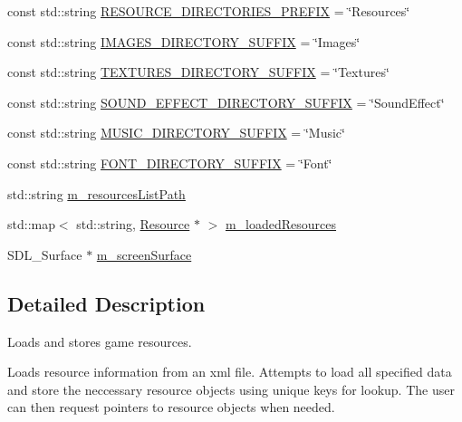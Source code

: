 \begin{DoxyCompactItemize}
\item 
const std\-::string \hyperlink{classn8_1_1_resource_manager_ac7a0bd07466d2db724c71608a373c83e}{R\-E\-S\-O\-U\-R\-C\-E\-\_\-\-D\-I\-R\-E\-C\-T\-O\-R\-I\-E\-S\-\_\-\-P\-R\-E\-F\-I\-X} = \char`\"{}Resources\char`\"{}
\item 
const std\-::string \hyperlink{classn8_1_1_resource_manager_aa8fd98d5b987be54652a08f49e5ac7f7}{I\-M\-A\-G\-E\-S\-\_\-\-D\-I\-R\-E\-C\-T\-O\-R\-Y\-\_\-\-S\-U\-F\-F\-I\-X} = \char`\"{}Images\char`\"{}
\item 
const std\-::string \hyperlink{classn8_1_1_resource_manager_af0ddf0154273d7fa5fc31f63b5ce387c}{T\-E\-X\-T\-U\-R\-E\-S\-\_\-\-D\-I\-R\-E\-C\-T\-O\-R\-Y\-\_\-\-S\-U\-F\-F\-I\-X} = \char`\"{}Textures\char`\"{}
\item 
const std\-::string \hyperlink{classn8_1_1_resource_manager_a3bdb6e51b5a59ce6278d2ed13321edbb}{S\-O\-U\-N\-D\-\_\-\-E\-F\-F\-E\-C\-T\-\_\-\-D\-I\-R\-E\-C\-T\-O\-R\-Y\-\_\-\-S\-U\-F\-F\-I\-X} = \char`\"{}Sound\-Effect\char`\"{}
\item 
const std\-::string \hyperlink{classn8_1_1_resource_manager_af0d462dc1037e8377c297a02d53e761c}{M\-U\-S\-I\-C\-\_\-\-D\-I\-R\-E\-C\-T\-O\-R\-Y\-\_\-\-S\-U\-F\-F\-I\-X} = \char`\"{}Music\char`\"{}
\item 
const std\-::string \hyperlink{classn8_1_1_resource_manager_aa8b34428079b65912e1bcc4ffc04fbf1}{F\-O\-N\-T\-\_\-\-D\-I\-R\-E\-C\-T\-O\-R\-Y\-\_\-\-S\-U\-F\-F\-I\-X} = \char`\"{}Font\char`\"{}
\item 
std\-::string \hyperlink{classn8_1_1_resource_manager_a8b5220baaa8694b0229fea6ef8155d74}{m\-\_\-resources\-List\-Path}
\item 
std\-::map$<$ std\-::string, \hyperlink{classn8_1_1_resource}{Resource} $\ast$ $>$ \hyperlink{classn8_1_1_resource_manager_a1599b33c3fbe8b04045c2f39ea4ec80a}{m\-\_\-loaded\-Resources}
\item 
S\-D\-L\-\_\-\-Surface $\ast$ \hyperlink{classn8_1_1_resource_manager_a871c40637220ed8c82d230410aaf2aa2}{m\-\_\-screen\-Surface}
\end{DoxyCompactItemize}


\subsection{Detailed Description}
Loads and stores game resources. 

Loads resource information from an xml file. Attempts to load all specified data and store the neccessary resource objects using unique keys for lookup. The user can then request pointers to resource objects when needed. 

